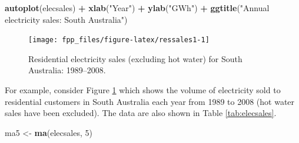 \documentclass[]{book}
\newenvironment{Shaded}{\begin{snugshade}}{\end{snugshade}}
\newcommand{\DecValTok}[1]{\textcolor[rgb]{0.00,0.00,0.81}{#1}}
\newcommand{\KeywordTok}[1]{\textcolor[rgb]{0.13,0.29,0.53}{\textbf{#1}}}
\newcommand{\NormalTok}[1]{#1}
\newcommand{\OperatorTok}[1]{\textcolor[rgb]{0.81,0.36,0.00}{\textbf{#1}}}
\newcommand{\StringTok}[1]{\textcolor[rgb]{0.31,0.60,0.02}{#1}}
\begin{document}
\begin{Shaded}
\begin{Highlighting}[]
\KeywordTok{autoplot}\NormalTok{(elecsales) }\OperatorTok{+}\StringTok{ }\KeywordTok{xlab}\NormalTok{(}\StringTok{"Year"}\NormalTok{) }\OperatorTok{+}\StringTok{ }\KeywordTok{ylab}\NormalTok{(}\StringTok{"GWh"}\NormalTok{) }\OperatorTok{+}
\StringTok{  }\KeywordTok{ggtitle}\NormalTok{(}\StringTok{"Annual electricity sales: South Australia"}\NormalTok{)}
\end{Highlighting}
\end{Shaded}

\begin{figure}

{\centering \texttt{[image: fpp\_files/figure-latex/ressales1-1]} 

}

\caption{Residential electricity sales (excluding hot water) for South Australia: 1989--2008.}\label{fig:ressales1}
\end{figure}

For example, consider Figure \ref{fig:ressales1} which shows the volume of electricity sold to residential customers in South Australia each year from 1989 to 2008 (hot water sales have been excluded). The data are also shown in Table \ref{tab:elecsales}.

\begin{Shaded}
\begin{Highlighting}[]
\NormalTok{ma5 <-}\StringTok{ }\KeywordTok{ma}\NormalTok{(elecsales, }\DecValTok{5}\NormalTok{)}
\end{Highlighting}
\end{Shaded}
\end{document}
